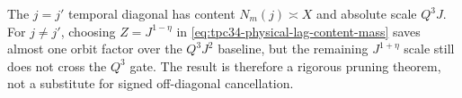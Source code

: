 The \(j=j'\) temporal diagonal has content \(N_m(j)\asymp X\) and
absolute scale \(Q^3J\).  For \(j\ne j'\), choosing
\(Z=J^{1-\eta}\) in \eqref{eq:tpc34-physical-lag-content-mass} saves
almost one orbit factor over the \(Q^3J^2\) baseline, but the remaining
\(J^{1+\eta}\) scale still does not cross the \(Q^3\) gate.  The result is
therefore a rigorous pruning theorem, not a substitute for signed
off-diagonal cancellation.
